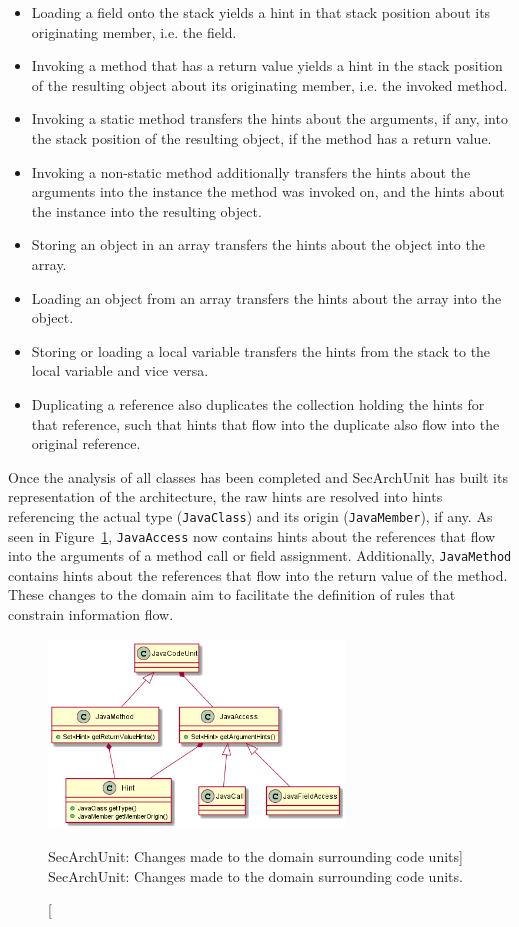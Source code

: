 \begin{itemize}
    \item Loading a field onto the stack yields a hint in that stack position about its originating member, i.e. the field.
    \item Invoking a method that has a return value yields a hint in the stack position of the resulting object about its originating member, i.e. the invoked method.
    \item Invoking a static method transfers the hints about the arguments, if any, into the stack position of the resulting object, if the method has a return value.
    \item Invoking a non-static method additionally transfers the hints about the arguments into the instance the method was invoked on, and the hints about the instance into the resulting object.
    \item Storing an object in an array transfers the hints about the object into the array.
    \item Loading an object from an array transfers the hints about the array into the object.
    \item Storing or loading a local variable transfers the hints from the stack to the local variable and vice versa.
    \item Duplicating a reference also duplicates the collection holding the hints for that reference, such that hints that flow into the duplicate also flow into the original reference.
\end{itemize}

Once the analysis of all classes has been completed and SecArchUnit has built its representation of the architecture, the raw hints are resolved into hints referencing the actual type (\texttt{JavaClass}) and its origin (\texttt{JavaMember}), if any. As seen in Figure~\ref{fig:domain_changes_1}, \texttt{JavaAccess} now contains hints about the references that flow into the arguments of a method call or field assignment. Additionally, \texttt{JavaMethod} contains hints about the references that flow into the return value of the method. These changes to the domain aim to facilitate the definition of rules that constrain information flow.

\begin{figure}
    \centering
    \includegraphics[width=0.7\textwidth]{figure/extension/DomainChanges1.png}
    \caption
        [SecArchUnit: Changes made to the domain surrounding code units]
        {SecArchUnit: Changes made to the domain surrounding code units.}
    \label{fig:domain_changes_1}
\end{figure}

